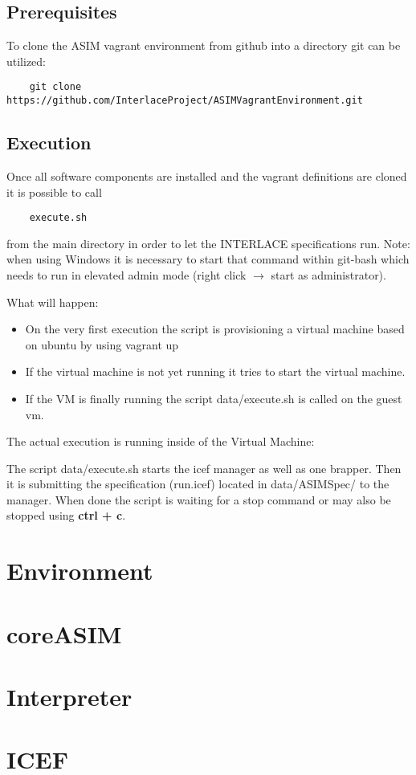 \subsection{Prerequisites}

To clone the ASIM vagrant environment from github into a directory git can be utilized:

\begin{lstlisting}
	git clone https://github.com/InterlaceProject/ASIMVagrantEnvironment.git
\end{lstlisting}

\subsection{Execution}

Once all software components are installed and the vagrant definitions are cloned it is
possible to call

\begin{lstlisting}
	execute.sh
\end{lstlisting}

from the main directory in order to let the INTERLACE specifications run.
Note: when using Windows it is necessary to start that command within
git-bash which needs to run in elevated admin mode (right click $\rightarrow$
start as administrator).

What will happen:
\begin{itemize}
	\item On the very first execution the script is provisioning a 
	virtual machine based on ubuntu by using vagrant up
	\item If the virtual machine is not yet running it tries to start
	the virtual machine.
	\item If the VM is finally running the script data/execute.sh is called on the guest vm.
\end{itemize}

The actual execution is running inside of the Virtual Machine:

The script data/execute.sh starts the icef manager as well as one brapper. Then it is submitting
the specification (run.icef) located in data/ASIMSpec/ to the manager. When
done the script is waiting for a stop command or may also be stopped using \textbf{ctrl + c}.

\section{Environment}

\section{coreASIM}

\section{Interpreter}

\section{ICEF}


